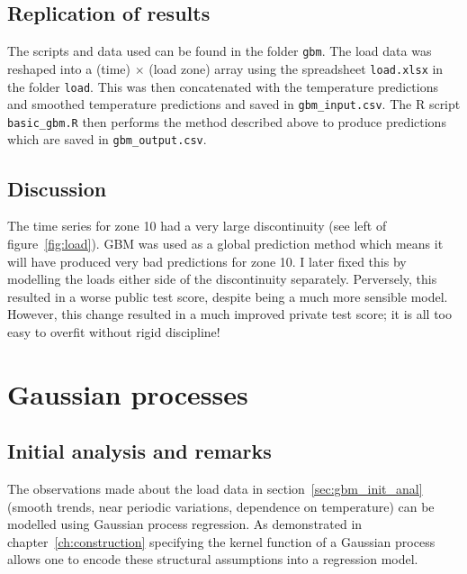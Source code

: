 
\subsection{Replication of results}

The scripts and data used can be found in the folder \texttt{gbm}.
The load data was reshaped into a (time) $\times$ (load zone) array using the spreadsheet \texttt{load.xlsx} in the folder \texttt{load}.
This was then concatenated with the temperature predictions and smoothed temperature predictions and saved in \texttt{gbm\_input.csv}.
The R script \texttt{basic\_gbm.R} then performs the method described above to produce predictions which are saved in \texttt{gbm\_output.csv}.

\subsection{Discussion}

The time series for zone 10 had a very large discontinuity (see left of figure~\ref{fig:load}).
GBM was used as a global prediction method which means it will have produced very bad predictions for zone 10.
I later fixed this by modelling the loads either side of the discontinuity separately.
Perversely, this resulted in a worse public test score, despite being a much more sensible model.
However, this change resulted in a much improved private test score; it is all too easy to overfit without rigid discipline!

\section{Gaussian processes}

\label{sec:gp}

\subsection{Initial analysis and remarks}

The observations made about the load data in section~\ref{sec:gbm_init_anal} (\ie smooth trends, near periodic variations, dependence on temperature) can be modelled using Gaussian process regression.
As demonstrated in chapter~\ref{ch:construction} specifying the kernel function of a Gaussian process allows one to encode these structural assumptions into a regression model.

